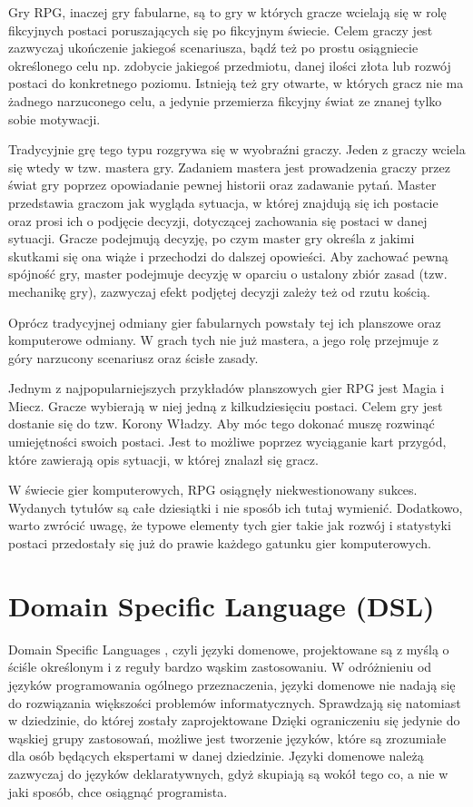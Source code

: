 \documentclass[openright]{xmgr}
\begin{document}
Gry RPG, inaczej gry fabularne, są to gry w których gracze wcielają się w rolę fikcyjnych postaci poruszających się po fikcyjnym świecie.  Celem graczy jest zazwyczaj ukończenie jakiegoś scenariusza, bądź też po prostu osiągniecie określonego celu np. zdobycie jakiegoś przedmiotu, danej ilości złota lub rozwój postaci do konkretnego poziomu. Istnieją też gry otwarte, w których gracz nie ma żadnego narzuconego celu, a jedynie przemierza fikcyjny świat ze znanej tylko sobie motywacji. 

Tradycyjnie grę tego typu rozgrywa się w wyobraźni graczy. Jeden z graczy wciela się wtedy w tzw. mastera gry. Zadaniem mastera jest prowadzenia graczy przez świat gry poprzez opowiadanie pewnej historii oraz zadawanie pytań. Master przedstawia graczom jak wygląda sytuacja, w której znajdują się ich postacie oraz prosi ich o podjęcie decyzji, dotyczącej zachowania się postaci w danej sytuacji. Gracze podejmują decyzję, po czym master gry określa z jakimi skutkami się ona wiąże i przechodzi do dalszej opowieści. Aby zachować pewną spójność gry, master podejmuje decyzję w oparciu o ustalony zbiór zasad (tzw. mechanikę gry), zazwyczaj efekt podjętej decyzji zależy też od rzutu kością.

Oprócz tradycyjnej odmiany gier fabularnych powstały tej ich planszowe oraz komputerowe odmiany. W grach tych nie już mastera, a jego rolę przejmuje z góry narzucony scenariusz oraz ścisłe zasady. 

Jednym z najpopularniejszych przykładów planszowych gier RPG jest Magia i Miecz. Gracze wybierają w niej jedną z kilkudziesięciu postaci. Celem gry jest dostanie się do tzw. Korony Władzy. Aby móc tego dokonać muszę rozwinąć umiejętności swoich postaci. Jest to możliwe poprzez wyciąganie kart przygód, które zawierają opis sytuacji, w której znalazł się gracz. 

W świecie gier komputerowych, RPG osiągnęły niekwestionowany sukces. Wydanych tytułów są całe dziesiątki i nie sposób ich tutaj wymienić. Dodatkowo, warto zwrócić uwagę, że typowe elementy tych gier takie jak rozwój i statystyki postaci przedostały się już do prawie każdego gatunku gier komputerowych.

\section{Domain Specific Language (DSL)}

Domain Specific Languages \cite{DSL:2017}, czyli języki domenowe, projektowane są z myślą o ściśle określonym i z reguły bardzo wąskim zastosowaniu. W odróżnieniu od języków programowania ogólnego przeznaczenia, języki domenowe nie nadają się do rozwiązania większości problemów informatycznych. Sprawdzają się natomiast w dziedzinie, do której zostały zaprojektowane Dzięki ograniczeniu się jedynie do wąskiej grupy zastosowań, możliwe jest tworzenie języków, które są zrozumiałe dla osób będących ekspertami w danej dziedzinie. Języki domenowe należą zazwyczaj do języków deklaratywnych, gdyż skupiają są wokół tego co, a nie w jaki sposób, chce osiągnąć programista.
\end{document}
